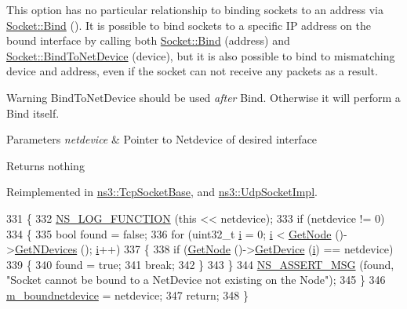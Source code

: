 This option has no particular relationship to binding sockets to an address via \hyperlink{classns3_1_1Socket_ada93439a43de2028b5a8fc6621dad482}{Socket\+::\+Bind} (). It is possible to bind sockets to a specific IP address on the bound interface by calling both \hyperlink{classns3_1_1Socket_ada93439a43de2028b5a8fc6621dad482}{Socket\+::\+Bind} (address) and \hyperlink{classns3_1_1Socket_a9952cd10a2c8c108846027108cc9e44e}{Socket\+::\+Bind\+To\+Net\+Device} (device), but it is also possible to bind to mismatching device and address, even if the socket can not receive any packets as a result.

\begin{DoxyWarning}{Warning}
Bind\+To\+Net\+Device should be used {\itshape after} Bind. Otherwise it will perform a Bind itself.
\end{DoxyWarning}

\begin{DoxyParams}{Parameters}
{\em netdevice} & Pointer to Netdevice of desired interface \\
\hline
\end{DoxyParams}
\begin{DoxyReturn}{Returns}
nothing 
\end{DoxyReturn}


Reimplemented in \hyperlink{classns3_1_1TcpSocketBase_a88b552dfa0a85e0224ed8a7dc140f190}{ns3\+::\+Tcp\+Socket\+Base}, and \hyperlink{classns3_1_1UdpSocketImpl_a93fa14afedc32353602551df1e5f2d59}{ns3\+::\+Udp\+Socket\+Impl}.


\begin{DoxyCode}
331 \{
332   \hyperlink{log-macros-disabled_8h_a90b90d5bad1f39cb1b64923ea94c0761}{NS\_LOG\_FUNCTION} (\textcolor{keyword}{this} << netdevice);
333   \textcolor{keywordflow}{if} (netdevice != 0)
334     \{
335       \textcolor{keywordtype}{bool} found = \textcolor{keyword}{false};
336       \textcolor{keywordflow}{for} (uint32\_t \hyperlink{bernuolliDistribution_8m_a6f6ccfcf58b31cb6412107d9d5281426}{i} = 0; \hyperlink{bernuolliDistribution_8m_a6f6ccfcf58b31cb6412107d9d5281426}{i} < \hyperlink{classns3_1_1Socket_aba642ad4301c1df47befc0aa9afa2e48}{GetNode} ()->\hyperlink{classns3_1_1Node_a531554d2241ba4fa1cd74e3360be6bce}{GetNDevices} (); \hyperlink{bernuolliDistribution_8m_a6f6ccfcf58b31cb6412107d9d5281426}{i}++)
337         \{
338           \textcolor{keywordflow}{if} (\hyperlink{classns3_1_1Socket_aba642ad4301c1df47befc0aa9afa2e48}{GetNode} ()->\hyperlink{classns3_1_1Node_a5918dfd24ef632efc9a83a5f6561c76e}{GetDevice} (\hyperlink{bernuolliDistribution_8m_a6f6ccfcf58b31cb6412107d9d5281426}{i}) == netdevice)
339             \{
340               found = \textcolor{keyword}{true};
341               \textcolor{keywordflow}{break};
342             \}
343         \}
344       \hyperlink{assert_8h_aff5ece9066c74e681e74999856f08539}{NS\_ASSERT\_MSG} (found, \textcolor{stringliteral}{"Socket cannot be bound to a NetDevice not existing on the Node"});
345     \}
346   \hyperlink{classns3_1_1Socket_a9781d8dfdb5e9364d5dce8f53b768bb5}{m\_boundnetdevice} = netdevice;
347   \textcolor{keywordflow}{return};
348 \}
\end{DoxyCode}


